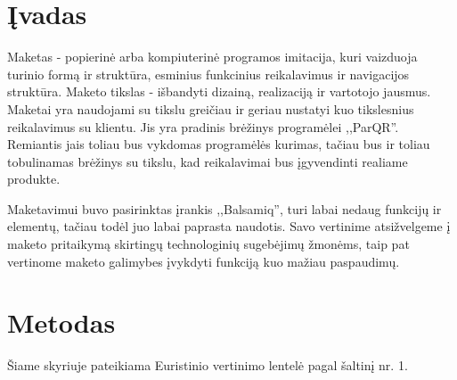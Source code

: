 \documentclass{VUMIFPSkursinis}
\begin{document}
\section{Įvadas}


Maketas - popierinė arba kompiuterinė programos imitacija, kuri vaizduoja turinio formą ir struktūra, esminius funkcinius reikalavimus ir navigacijos struktūra. Maketo tikslas - išbandyti dizainą, realizaciją ir vartotojo jausmus. Maketai yra naudojami su tikslu greičiau ir geriau nustatyi kuo tikslesnius reikalavimus su klientu. Jis yra pradinis brėžinys programėlei ,,ParQR''. Remiantis jais toliau bus vykdomas programėlės kurimas, tačiau bus ir toliau tobulinamas brėžinys su tikslu, kad reikalavimai bus įgyvendinti realiame produkte. 

Maketavimui buvo pasirinktas įrankis ,,Balsamiq'', turi labai nedaug funkcijų ir elementų, tačiau todėl juo labai paprasta naudotis. 
Savo vertinime atsižvelgeme į maketo pritaikymą skirtingų technologinių sugebėjimų žmonėms, taip pat vertinome maketo galimybes įvykdyti funkciją kuo mažiau paspaudimų.

\section{Metodas}

Šiame skyriuje pateikiama Euristinio vertinimo lentelė pagal šaltinį nr. 1.
\end{document}
